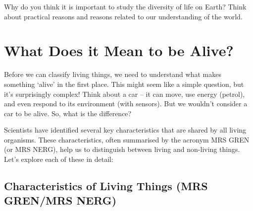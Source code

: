 \begin{stopandthink}
Why do you think it is important to study the diversity of life on Earth?  Think about practical reasons and reasons related to our understanding of the world.
\end{stopandthink}


\section{What Does it Mean to be Alive?}

Before we can classify living things, we need to understand what makes something ‘alive’ in the first place.  This might seem like a simple question, but it's surprisingly complex!  Think about a car – it can move, use energy (petrol), and even respond to its environment (with sensors).  But we wouldn’t consider a car to be alive.  So, what is the difference?

Scientists have identified several key characteristics that are shared by all living organisms. These characteristics, often summarised by the acronym MRS GREN (or MRS NERG), help us to distinguish between living and non-living things. Let's explore each of these in detail:

\subsection{Characteristics of Living Things (MRS GREN/MRS NERG)}

